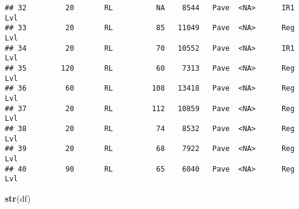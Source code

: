 \documentclass[
]{article}
\newenvironment{Shaded}{\begin{snugshade}}{\end{snugshade}}
\newcommand{\FunctionTok}[1]{\textcolor[rgb]{0.13,0.29,0.53}{\textbf{#1}}}
\newcommand{\NormalTok}[1]{#1}
\begin{document}
\begin{verbatim}
## 32         20       RL          NA    8544   Pave  <NA>      IR1         Lvl
## 33         20       RL          85   11049   Pave  <NA>      Reg         Lvl
## 34         20       RL          70   10552   Pave  <NA>      IR1         Lvl
## 35        120       RL          60    7313   Pave  <NA>      Reg         Lvl
## 36         60       RL         108   13418   Pave  <NA>      Reg         Lvl
## 37         20       RL         112   10859   Pave  <NA>      Reg         Lvl
## 38         20       RL          74    8532   Pave  <NA>      Reg         Lvl
## 39         20       RL          68    7922   Pave  <NA>      Reg         Lvl
## 40         90       RL          65    6040   Pave  <NA>      Reg         Lvl
\end{verbatim}

\begin{Shaded}
\begin{Highlighting}[]
\FunctionTok{str}\NormalTok{(df)}
\end{Highlighting}
\end{Shaded}
\end{document}
